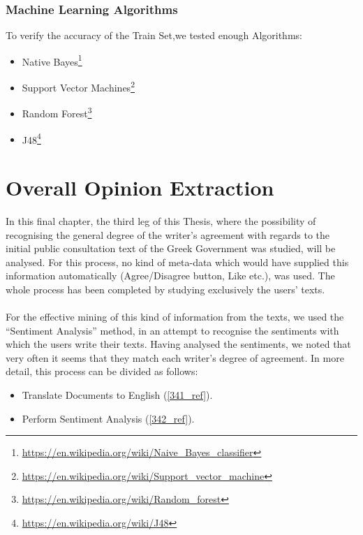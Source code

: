 \subsubsection{Machine Learning Algorithms}\label{3353_ref}
To verify the accuracy of the Train Set,we tested enough Algorithms:\\

\begin{itemize}

		\item Native Bayes\footnote{\url{https://en.wikipedia.org/wiki/Naive_Bayes_classifier}}
	\item Support Vector Machines\footnote{\url{https://en.wikipedia.org/wiki/Support_vector_machine}}
	\item Random Forest\footnote{\url{https://en.wikipedia.org/wiki/Random_forest}}
	\item J48\footnote{\url{https://en.wikipedia.org/wiki/J48}}

\end{itemize}

\section{Overall Opinion Extraction}\label{34_ref}
In this final chapter, the third leg of this Thesis, where the possibility of recognising the general degree of the writer's agreement with regards to the initial public consultation text of the Greek Government was studied, will be analysed. For this process, no kind of meta-data which would have supplied this information automatically (Agree/Disagree button, Like etc.), was used. The whole process has been completed by studying exclusively the users' texts.\\
\\
For the effective mining of this kind of information from the texts, we used the ``Sentiment Analysis'' method, in an attempt to recognise the sentiments with which the users write their texts. Having analysed the sentiments, we noted that very often it seems that they match each writer's degree of agreement. In more detail, this process can be divided as follows:\\
\begin{itemize}

	\item Translate Documents to English (\ref{341_ref}).
	\item Perform Sentiment Analysis  (\ref{342_ref}).

\end{itemize}
